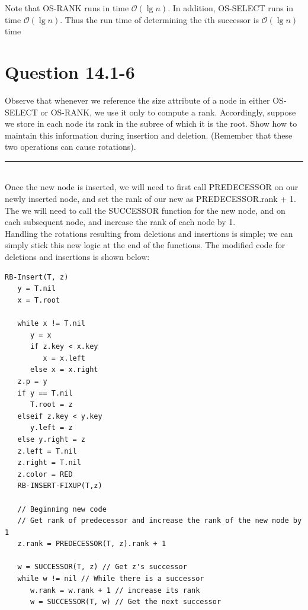 \documentclass[20pt]{article} %
\begin{document}
Note that OS-RANK runs in time $\mathcal{O}(\lg n)$. In addition, OS-SELECT runs in time  $\mathcal{O}(\lg n)$.  Thus the run time of determining the $i$th successor is $\mathcal{O}(\lg n)$ time

\newpage
\section{Question 14.1-6}
Observe that whenever we reference the size attribute of a node in either OS-SELECT or OS-RANK, we use it only to compute a rank.  Accordingly, suppose we store in each node its rank in the subree of which it is the root. Show how to maintain this information during insertion and deletion. (Remember that these two operations can cause rotations). \\
\noindent\rule{2cm}{0.4pt} \\

Once the new node is inserted, we will need to first call PREDECESSOR on our newly inserted node, and set the rank of our new as PREDECESSOR.rank + 1. The we will need to call the SUCCESSOR function for the new node, and on each subsequent node, and increase the rank of each node by 1. \\

Handling the rotations resulting from deletions and insertions is simple; we can simply stick this new logic at the end of the functions.  The modified code for deletions and insertions is shown below:

\begin{verbatim}
RB-Insert(T, z)
   y = T.nil
   x = T.root
	
   while x != T.nil
      y = x
      if z.key < x.key
         x = x.left
      else x = x.right
   z.p = y
   if y == T.nil
      T.root = z
   elseif z.key < y.key
      y.left = z
   else y.right = z
   z.left = T.nil
   z.right = T.nil
   z.color = RED
   RB-INSERT-FIXUP(T,z)

   // Beginning new code
   // Get rank of predecessor and increase the rank of the new node by 1
   z.rank = PREDECESSOR(T, z).rank + 1 

   w = SUCCESSOR(T, z) // Get z's successor
   while w != nil // While there is a successor
      w.rank = w.rank + 1 // increase its rank
      w = SUCCESSOR(T, w) // Get the next successor

\end{verbatim} \\
\end{document}
